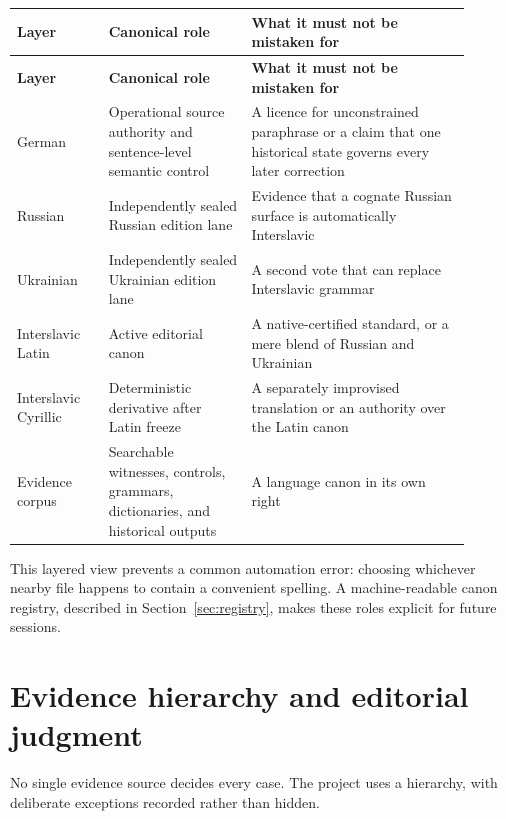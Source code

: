 \documentclass[11pt,a4paper]{article}
\begin{document}
\begin{longtable}{>{\raggedright\arraybackslash}p{0.18\linewidth} >{\raggedright\arraybackslash}p{0.29\linewidth} >{\raggedright\arraybackslash}p{0.43\linewidth}}
\toprule
\textbf{Layer} & \textbf{Canonical role} & \textbf{What it must not be mistaken for} \\
\midrule
\endfirsthead
\toprule
\textbf{Layer} & \textbf{Canonical role} & \textbf{What it must not be mistaken for} \\
\midrule
\endhead
German & Operational source authority and sentence-level semantic control & A licence for unconstrained paraphrase or a claim that one historical state governs every later correction \\
Russian & Independently sealed Russian edition lane & Evidence that a cognate Russian surface is automatically Interslavic \\
Ukrainian & Independently sealed Ukrainian edition lane & A second vote that can replace Interslavic grammar \\
Interslavic Latin & Active editorial canon & A native-certified standard, or a mere blend of Russian and Ukrainian \\
Interslavic Cyrillic & Deterministic derivative after Latin freeze & A separately improvised translation or an authority over the Latin canon \\
Evidence corpus & Searchable witnesses, controls, grammars, dictionaries, and historical outputs & A language canon in its own right \\
\bottomrule
\end{longtable}

This layered view prevents a common automation error: choosing whichever nearby file happens to contain a convenient spelling. A machine-readable canon registry, described in Section~\ref{sec:registry}, makes these roles explicit for future sessions.

\section{Evidence hierarchy and editorial judgment}

No single evidence source decides every case. The project uses a hierarchy, with deliberate exceptions recorded rather than hidden.
\end{document}
